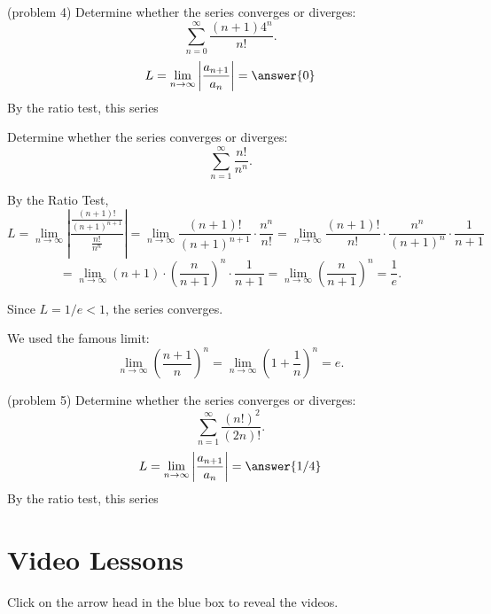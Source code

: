 \documentclass{ximera}
\begin{document}
\begin{problem}(problem 4)
Determine whether the series converges or diverges:
\[
\sum_{n=0}^\infty \frac{(n+1)4^n}{n!}.
\]
\[
L = \lim_{n \to \infty} \left|\frac{a_{n+1}}{a_n}\right| = \answer{0}
\]
By the ratio test, this series 

\end{problem}






\begin{example}[example 5]
Determine whether the series converges or diverges:
\[
\sum_{n=1}^\infty \frac{n!}{n^n}.
\]


By the Ratio Test,
\[
L =  \lim_{n \to \infty} \left|\frac{\frac{(n+1)!}{(n+1)^{n+1}}}{\frac{n!}{n^n}}\right| = 
\lim_{n \to \infty} \frac{(n+1)!}{(n+1)^{n+1}}\cdot \frac{n^n}{n!}
=  \lim_{n \to \infty} \frac{(n+1)!}{n!} \cdot  \frac{n^n}{(n+1)^n}\cdot \frac{1}{n+1}
\]
\[
= \lim_{n \to \infty} (n+1) \cdot \left(\frac{n}{n+1}\right)^n \cdot \frac{1}{n+1} = \lim_{n \to \infty} \left(\frac{n}{n+1}\right)^n = \frac{1}{e}.
\]


Since $L = 1/e < 1$, the series converges.

\begin{remark}
We used the famous limit:
\[
\lim_{n \to \infty} \left(\frac{n+1}{n}\right)^n = \lim_{n \to \infty} \left(1 + \frac{1}{n}\right)^n = e.
\]
\end{remark}


\end{example}



\begin{problem}(problem 5)
Determine whether the series converges or diverges:
\[
\sum_{n=1}^\infty \frac{(n!)^2}{(2n)!}.
\]
\[
L = \lim_{n \to \infty} \left|\frac{a_{n+1}}{a_n}\right| = \answer{1/4}
\]
By the ratio test, this series 

\end{problem}




\section{Video Lessons}

Click on the arrow head in the blue box to reveal the videos.\\
\end{document}
